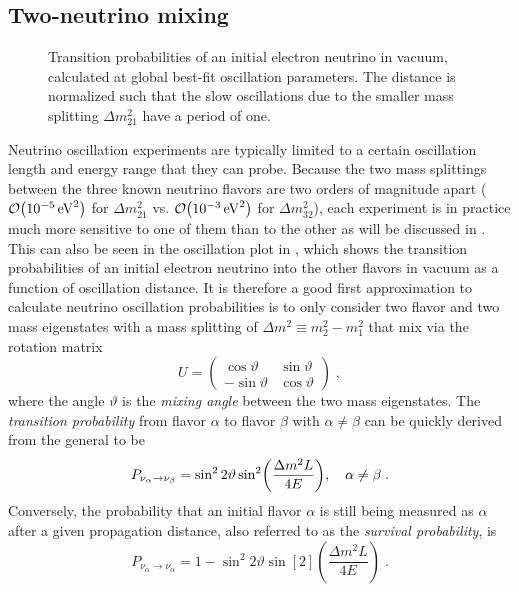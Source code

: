 \subsection{Two-neutrino mixing}
\begin{figure}
    \centering
    
    \caption{Transition probabilities of an initial electron neutrino in vacuum, calculated at global best-fit\cite{nufit40} oscillation parameters. The distance is normalized such that the slow oscillations due to the smaller mass splitting $\Delta m^2_{21}$ have a period of one.\label{fig:simple-oscillogram}}
\end{figure}
Neutrino oscillation experiments are typically limited to a certain oscillation length and energy range that they can probe. Because the two mass splittings between the three known neutrino flavors are two orders of magnitude apart ($\order{\SI{e-5}{eV^2}}$ for $\Delta m^2_{21}$ vs. $\order{\SI{e-3}{eV^2}}$ for $\Delta m^2_{32}$)\cite{nufit40}, each experiment is in practice much more sensitive to one of them than to the other as will be discussed in .
This can also be seen in the oscillation plot in , which shows the transition probabilities of an initial electron neutrino into the other flavors in vacuum as a function of oscillation distance.
It is therefore a good first approximation to calculate neutrino oscillation probabilities is to only consider two flavor and two mass eigenstates with a mass splitting of $\Delta m^2 \equiv m_2^2 - m_1^2$ that mix via the rotation matrix
\begin{equation}
    U =
    \begin{pmatrix}
        \cos \vartheta & \sin \vartheta \\
        -\sin \vartheta & \cos \vartheta
    \end{pmatrix}\;,\label{eq:two-flav-pmns}
\end{equation}
where the angle $\vartheta$ is the \emph{mixing angle} between the two mass eigenstates.
The \emph{transition probability} from flavor $\alpha$ to flavor $\beta$ with $\alpha \neq \beta$ can be quickly derived from the general  to be
\begin{equation}
    P_{\nu_\alpha \rightarrow \nu_\beta} = \sin^2 2\vartheta \sin[2](\frac{\Delta m^2L}{4E})\qc\alpha \neq \beta\;.
\end{equation}
Conversely, the probability that an initial flavor $\alpha$ is still being measured as $\alpha$ after a given propagation distance, also referred to as the \emph{survival probability}, is
\begin{equation}
    P_{\nu_\alpha \rightarrow \nu_\alpha} = 1 - \sin^2 2\vartheta \sin[2](\frac{\Delta m^2L}{4E})\;.
\end{equation}

